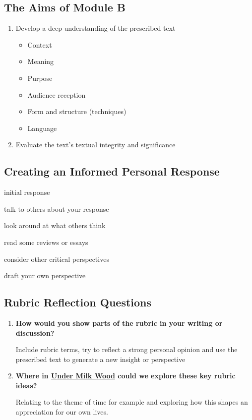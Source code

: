 	\subsection{The Aims of Module B}
	
		\begin{enumerate}
			\item Develop a deep understanding of the prescribed text
				\begin{itemize}
					\item Context
					\item Meaning
					\item Purpose
					\item Audience reception
					\item Form and structure (techniques)
					\item Language
				\end{itemize}
			
			\item Evaluate the text's textual integrity and significance
		\end{enumerate}

	\subsection{Creating an Informed Personal Response}
	
		initial response

		talk to others about your response
		
		look around at what others think

		read some reviews or essays

		consider other critical perspectives

		draft your own perspective

	\subsection{Rubric Reflection Questions}
		
		\begin{enumerate}
			\item \textbf{How would you show parts of the rubric in your writing or discussion?}
					
				\subitem Include rubric terms, try to reflect a strong personal opinion and use the prescribed text to generate a new insight or perspective

			\item \textbf{Where in \underline{Under Milk Wood} could we explore these key rubric ideas?}

				\subitem Relating to the theme of time for example and exploring how this shapes an appreciation for our own lives.
		\end{enumerate}

